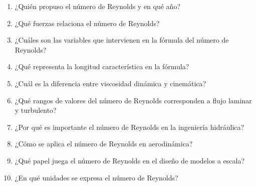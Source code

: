 \documentclass[../main]{subfiles}
\begin{document}

\begin{enumerate}
    \item ¿Quién propuso el número de Reynolds y en qué año?
    \item ¿Qué fuerzas relaciona el número de Reynolds?
    \item ¿Cuáles son las variables que intervienen en la fórmula del número de Reynolds?
    \item ¿Qué representa la longitud característica en la fórmula?
    \item ¿Cuál es la diferencia entre viscosidad dinámica y cinemática?
    \item ¿Qué rangos de valores del número de Reynolds corresponden a flujo laminar y turbulento?
    \item ¿Por qué es importante el número de Reynolds en la ingeniería hidráulica?
    \item ¿Cómo se aplica el número de Reynolds en aerodinámica?
    \item ¿Qué papel juega el número de Reynolds en el diseño de modelos a escala?
    \item ¿En qué unidades se expresa el número de Reynolds?
\end{enumerate}
\end{document}
